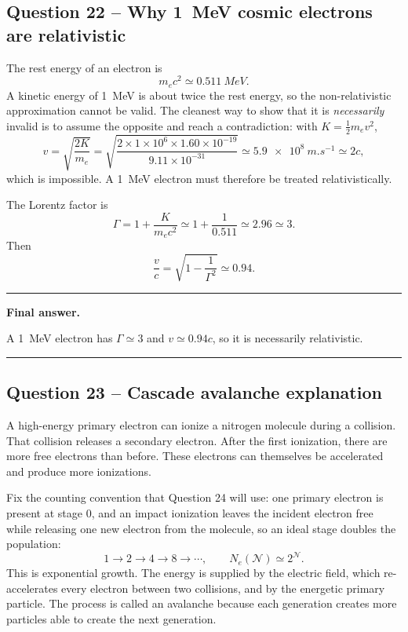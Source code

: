 \documentclass[11pt,a4paper]{article}
\newenvironment{finalanswer}{%
  \begin{center}\begin{minipage}{0.94\linewidth}\hrule\vspace{0.45em}\textbf{Final answer. }%
}{%
  \vspace{0.45em}\hrule\end{minipage}\end{center}%
}
\begin{document}
\subsection*{Question 22 -- Why \SI{1}{MeV} cosmic electrons are relativistic}

The rest energy of an electron is
\[
 m_e c^2\simeq\SI{0.511}{MeV}.
\]
A kinetic energy of \SI{1}{MeV} is about twice the rest energy, so the
non-relativistic approximation cannot be valid. The cleanest way to show that it
is \emph{necessarily} invalid is to assume the opposite and reach a
contradiction: with $K=\tfrac12 m_ev^2$,
\[
 v=\sqrt{\frac{2K}{m_e}}
  =\sqrt{\frac{2\times1\times10^{6}\times1.60\times10^{-19}}{9.11\times10^{-31}}}
  \simeq\SI{5.9e8}{m.s^{-1}}\simeq2c,
\]
which is impossible. A \SI{1}{MeV} electron must therefore be treated
relativistically.

The Lorentz factor is
\[
 \Gamma=1+\frac{K}{m_e c^2}
 \simeq1+\frac{1}{0.511}
 \simeq2.96\simeq3.
\]
Then
\[
 \frac{v}{c}=\sqrt{1-\frac{1}{\Gamma^2}}
 \simeq0.94.
\]

\begin{finalanswer}
A \SI{1}{MeV} electron has $\Gamma\simeq3$ and $v\simeq0.94c$, so it is necessarily relativistic.
\end{finalanswer}

\subsection*{Question 23 -- Cascade avalanche explanation}

A high-energy primary electron can ionize a nitrogen molecule during a collision. That collision releases a secondary electron. After the first ionization, there are more free electrons than before. These electrons can themselves be accelerated and produce more ionizations.

Fix the counting convention that Question 24 will use: one primary electron is
present at stage $0$, and an impact ionization leaves the incident electron free
while releasing one new electron from the molecule, so an ideal stage doubles the
population:
\[
 1\to2\to4\to8\to\cdots,
 \qquad
 N_e(\mathcal{N})\simeq2^{\mathcal{N}} .
\]
This is exponential growth. The energy is supplied by the electric field, which
re-accelerates every electron between two collisions, and by the energetic
primary particle. The process is called an avalanche because each generation creates more particles able to create the next generation.
\end{document}
